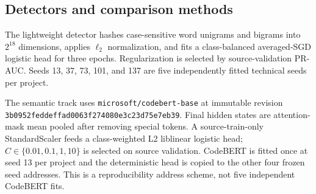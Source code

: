 \documentclass[preprint,12pt]{elsarticle}
\begin{document}
\begin{table}[t]
\centering
\caption{DiverseVul external project groups. Target rows are exact-deduplicated functions; vulnerability prevalence is reported only descriptively after label release.}
\label{tab:projects}
\small
\setlength{\tabcolsep}{3pt}
%
\end{table}

\subsection{Detectors and comparison methods}

The lightweight detector hashes case-sensitive word unigrams and bigrams into $2^{18}$ dimensions, applies $\ell_2$ normalization, and fits a class-balanced averaged-SGD logistic head for three epochs. Regularization is selected by source-validation PR-AUC. Seeds 13, 37, 73, 101, and 137 are five independently fitted technical seeds per project.

The semantic track uses \texttt{microsoft/codebert-base} at immutable revision \texttt{3b0952feddeffad0063f274080e3c23d75e7eb39}. Final hidden states are attention-mask mean pooled after removing special tokens. A source-train-only StandardScaler feeds a class-weighted L2 liblinear logistic head; $C\in\{0.01,0.1,1,10\}$ is selected on source validation. CodeBERT is fitted once at seed 13 per project and the deterministic head is copied to the other four frozen seed addresses. This is a reproducibility address scheme, not five independent CodeBERT fits.
\end{document}
